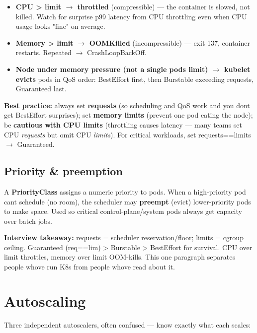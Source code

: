 \documentclass[11pt]{article}
\providecommand{\tightlist}{\setlength{\itemsep}{1pt}\setlength{\parskip}{0pt}}
\begin{document}
\begin{itemize}
\tightlist
\item
  \textbf{CPU \textgreater{} limit \(\rightarrow\) throttled} (compressible) --- the container is slowed, not killed. Watch for surprise p99 latency from CPU throttling even when CPU usage looks "fine" on average.
\item
  \textbf{Memory \textgreater{} limit \(\rightarrow\) OOMKilled} (incompressible) --- exit 137, container restarts. Repeated \(\rightarrow\) CrashLoopBackOff.
\item
  \textbf{Node under memory pressure (not a single pod\textquotesingle s limit) \(\rightarrow\) kubelet evicts} pods in QoS order: BestEffort first, then Burstable exceeding requests, Guaranteed last.
\end{itemize}

\textbf{Best practice:} always set \textbf{requests} (so scheduling and QoS work and you don\textquotesingle t get BestEffort surprises); set \textbf{memory limits} (prevent one pod eating the node); be \textbf{cautious with CPU limits} (throttling causes latency --- many teams set CPU \emph{requests} but omit CPU \emph{limits}). For critical workloads, set requests==limits \(\rightarrow\) Guaranteed.

\subsection{Priority \& preemption}\label{priority--preemption}

A \textbf{PriorityClass} assigns a numeric priority to pods. When a high-priority pod can\textquotesingle t schedule (no room), the scheduler may \textbf{preempt} (evict) lower-priority pods to make space. Used so critical control-plane/system pods always get capacity over batch jobs.

\textbf{Interview takeaway:} requests = scheduler reservation/floor; limits = cgroup ceiling. Guaranteed (req==lim) \textgreater{} Burstable \textgreater{} BestEffort for survival. CPU over limit throttles, memory over limit OOM-kills. This one paragraph separates people who\textquotesingle ve run K8s from people who\textquotesingle ve read about it.

\section{Autoscaling}\label{autoscaling}

Three independent autoscalers, often confused --- know exactly what each scales:
\end{document}
